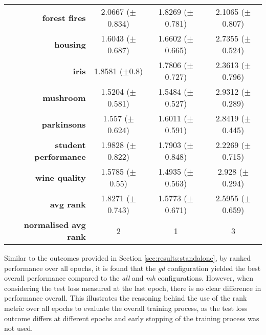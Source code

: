 \begin{table}[htb]
{\begin{tabular}{r|ccc}
			\textbf{forest fires}        & \cellcolor[rgb]{ 1,  .922,  .518}2.0667 ($\pm$0.834)       & \cellcolor[rgb]{ .388,  .745,  .482}1.8269 ($\pm$0.781) & \cellcolor[rgb]{ .973,  .412,  .42}2.1065 ($\pm$0.807) \\
			\textbf{housing}             & \cellcolor[rgb]{ .388,  .745,  .482}1.6043 ($\pm$0.687)    & \cellcolor[rgb]{ 1,  .922,  .518}1.6602 ($\pm$0.665)    & \cellcolor[rgb]{ .973,  .412,  .42}2.7355 ($\pm$0.524) \\
			\textbf{iris}                & \cellcolor[rgb]{ 1,  .922,  .518}1.8581 ($\pm$0.8)         & \cellcolor[rgb]{ .388,  .745,  .482}1.7806 ($\pm$0.727) & \cellcolor[rgb]{ .973,  .412,  .42}2.3613 ($\pm$0.796) \\
			\textbf{mushroom}            & \cellcolor[rgb]{ .388,  .745,  .482}1.5204 ($\pm$0.581)    & \cellcolor[rgb]{ 1,  .922,  .518}1.5484 ($\pm$0.527)    & \cellcolor[rgb]{ .973,  .412,  .42}2.9312 ($\pm$0.289) \\
			\textbf{parkinsons}          & \cellcolor[rgb]{ .388,  .745,  .482}1.557 ($\pm$0.624)     & \cellcolor[rgb]{ 1,  .922,  .518}1.6011 ($\pm$0.591)    & \cellcolor[rgb]{ .973,  .412,  .42}2.8419 ($\pm$0.445) \\
			\textbf{student performance} & \cellcolor[rgb]{ 1,  .922,  .518}1.9828 ($\pm$0.822)       & \cellcolor[rgb]{ .388,  .745,  .482}1.7903 ($\pm$0.848) & \cellcolor[rgb]{ .973,  .412,  .42}2.2269 ($\pm$0.715) \\
			\textbf{wine quality}        & \cellcolor[rgb]{ 1,  .922,  .518}1.5785 ($\pm$0.55)        & \cellcolor[rgb]{ .388,  .745,  .482}1.4935 ($\pm$0.563) & \cellcolor[rgb]{ .973,  .412,  .42}2.928 ($\pm$0.294)  \\
			\midrule
			\textbf{avg rank}            & \cellcolor[rgb]{ 1,  .922,  .518}1.8271 ($\pm$0.743)       & \cellcolor[rgb]{ .388,  .745,  .482}1.5773 ($\pm$0.671) & \cellcolor[rgb]{ .973,  .412,  .42}2.5955 ($\pm$0.659) \\
			\midrule
			\textbf{normalised avg rank} & \cellcolor[rgb]{ 1,  .922,  .518}2                         & \cellcolor[rgb]{ .388,  .745,  .482}1                   & \cellcolor[rgb]{ .973,  .412,  .42}3                   \\
		\end{tabular}%
	}
\end{table}%

Similar to the outcomes provided in Section \ref{sec:results:standalone}, by ranked performance over all epochs, it is found that the \textit{gd} configuration yielded the best overall performance compared to the \textit{all} and \textit{mh} configurations. However, when considering the test loss measured at the last epoch, there is no clear difference in performance overall. This illustrates the reasoning behind the use of the rank metric over all epochs to evaluate the overall training process, as the test loss outcome differs at different epochs and early stopping of the training process was not used.

